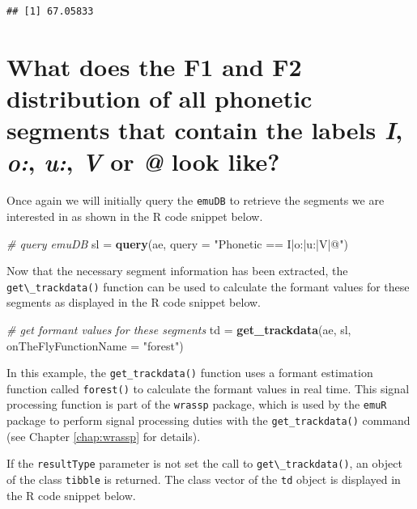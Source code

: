 \documentclass[]{book}
\newenvironment{Shaded}{\begin{snugshade}}{\end{snugshade}}
\newcommand{\CommentTok}[1]{\textcolor[rgb]{0.56,0.35,0.01}{\textit{#1}}}
\newcommand{\DataTypeTok}[1]{\textcolor[rgb]{0.13,0.29,0.53}{#1}}
\newcommand{\KeywordTok}[1]{\textcolor[rgb]{0.13,0.29,0.53}{\textbf{#1}}}
\newcommand{\NormalTok}[1]{#1}
\newcommand{\StringTok}[1]{\textcolor[rgb]{0.31,0.60,0.02}{#1}}
\begin{document}
\begin{verbatim}
## [1] 67.05833
\end{verbatim}

\hypertarget{sec:app-chap-useCases-q2}{%
\section{\texorpdfstring{What does the F1 and F2 distribution of all phonetic segments that contain the labels \emph{I}, \emph{o:}, \emph{u:}, \emph{V} or \emph{@} look like?}{What does the F1 and F2 distribution of all phonetic segments that contain the labels I, o:, u:, V or @ look like?}}\label{sec:app-chap-useCases-q2}}

Once again we will initially query the \texttt{emuDB} to retrieve the segments we are interested in as shown in the R code snippet below.

\begin{Shaded}
\begin{Highlighting}[]
\CommentTok{# query emuDB}
\NormalTok{sl =}\StringTok{ }\KeywordTok{query}\NormalTok{(ae, }\DataTypeTok{query =} \StringTok{"Phonetic == I|o:|u:|V|@"}\NormalTok{)}
\end{Highlighting}
\end{Shaded}

Now that the necessary segment information has been extracted, the \texttt{get\textbackslash{}\_trackdata()} function can be used to calculate the formant values for these segments as displayed in the R code snippet below.

\begin{Shaded}
\begin{Highlighting}[]
\CommentTok{# get formant values for these segments}
\NormalTok{td =}\StringTok{ }\KeywordTok{get_trackdata}\NormalTok{(ae, }
\NormalTok{                   sl,}
                   \DataTypeTok{onTheFlyFunctionName =} \StringTok{"forest"}\NormalTok{)}
\end{Highlighting}
\end{Shaded}

In this example, the \texttt{get\_trackdata()} function uses a formant estimation function called \texttt{forest()} to calculate the formant values in real time. This signal processing function is part of the \texttt{wrassp} package, which is used by the \texttt{emuR} package to perform signal processing duties with the \texttt{get\_trackdata()} command (see Chapter \ref{chap:wrassp} for details).

If the \texttt{resultType} parameter is not set the call to \texttt{get\textbackslash{}\_trackdata()}, an object of the class \texttt{tibble} is returned. The class vector of the \texttt{td} object is displayed in the R code snippet below.
\end{document}
